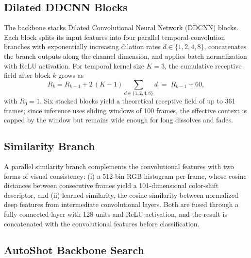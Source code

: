 \subsection{Dilated DDCNN Blocks}

The backbone stacks Dilated Convolutional Neural Network (DDCNN) blocks.
Each block splits its input features into four parallel temporal-convolution
branches with exponentially increasing dilation rates $d\in\{1,2,4,8\}$,
concatenates the branch outputs along the channel dimension, and applies
batch normalization with ReLU activation. For temporal kernel size $K{=}3$,
the cumulative receptive field after block $k$ grows as
\begin{equation}
    R_k = R_{k-1} + 2\,(K-1)\!\!\sum_{d\in\{1,2,4,8\}}\!\! d \;=\; R_{k-1} + 60,
    \label{eq:receptive}
\end{equation}
with $R_0{=}1$. Six stacked blocks yield a theoretical receptive field of up
to 361 frames; since inference uses sliding windows of 100 frames, the
effective context is capped by the window but remains wide enough for long
dissolves and fades.

\subsection{Similarity Branch}

A parallel similarity branch complements the convolutional features with two
forms of visual consistency: (i) a 512-bin RGB histogram per frame, whose
cosine distances between consecutive frames yield a 101-dimensional
color-shift descriptor, and (ii) learned similarity, the cosine similarity
between normalized deep features from intermediate convolutional layers.
Both are fused through a fully connected layer with 128 units and ReLU
activation, and the result is concatenated with the convolutional features
before classification.

\subsection{AutoShot Backbone Search}

